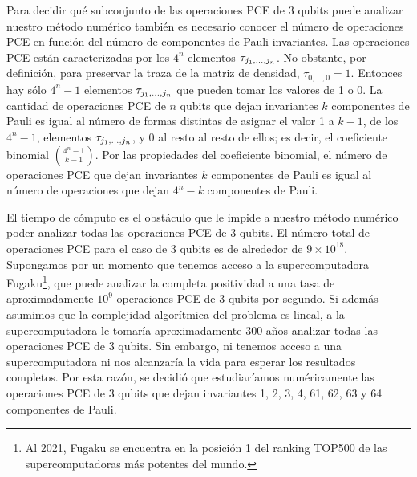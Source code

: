 Para decidir qué subconjunto de las operaciones PCE de 3 qubits puede analizar
nuestro método numérico también es necesario conocer el número 
de operaciones PCE en función del número de componentes 
de Pauli invariantes. Las operaciones PCE están caracterizadas 
por los $4^n$ elementos $\tau_{j_1,\ldots ,j_n}$. No obstante, por definición, 
para preservar la traza de la matriz de densidad, $\tau_{0,\ldots,0}=1$.
Entonces hay sólo $4^n-1$ elementos $\tau_{j_1,\ldots ,j_n}$ que pueden tomar los valores de 1 o 0.
La cantidad de operaciones PCE de $n$ qubits que dejan invariantes $k$ componentes 
de Pauli es igual al número de formas distintas de asignar el valor 1
a $k-1$, de los $4^n-1$, elementos $\tau_{j_1,\ldots ,j_n}$, y 0 al resto al resto de ellos; 
es decir, el coeficiente binomial $\binom{4^n-1}{k-1}$. Por las propiedades
del coeficiente binomial, el número de operaciones PCE que dejan invariantes 
$k$ componentes de Pauli es igual al número de operaciones que dejan $4^n-k$
componentes de Pauli. 

El tiempo de cómputo es el obstáculo que le impide a nuestro método numérico
poder analizar todas las operaciones PCE de 3 qubits. 
El número total de operaciones PCE para el caso 
de 3 qubits es de alrededor de $9\times10^{18}$. Supongamos por un momento
que tenemos acceso a la supercomputadora Fugaku\footnote{Al 2021, 
Fugaku se encuentra en la posición 1 del ranking TOP500 de las supercomputadoras
más potentes del mundo.},
que puede analizar la completa positividad a una tasa de
aproximadamente $10^9$ operaciones PCE de 
3 qubits por segundo. Si además asumimos que la complejidad 
algorítmica del problema es lineal, a la supercomputadora le tomaría
aproximadamente 300 años analizar todas las operaciones PCE de 3 qubits.
Sin embargo, ni tenemos acceso a una supercomputadora
ni nos alcanzaría la vida para esperar los resultados completos. 
Por esta razón, se decidió que estudiaríamos numéricamente 
las operaciones PCE de 3 qubits que dejan invariantes 1, 2, 3, 4, 61, 62, 63 y 64
componentes de Pauli.



